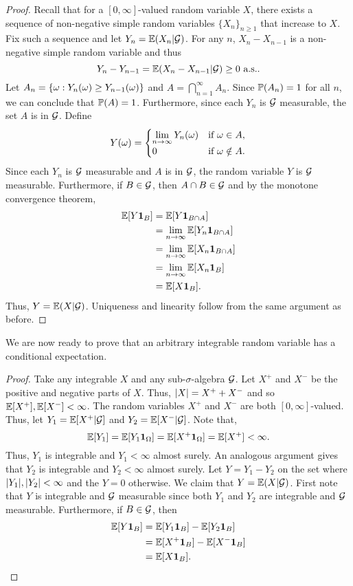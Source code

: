 \begin{proof}
    Recall that for a $[0,\infty]$-valued random variable $X$, there exists a sequence of non-negative simple random variables $\{X_n\}_{n \ge 1}$ that increase to $X$. Fix such a sequence and let $Y_n = {\mathbb{E}}(X_n|{\mathcal{G}})$. For any $n$, $X_{n}-X_{n-1}$ is a non-negative simple random variable and thus 
    \[Y_n - Y_{n-1} = {\mathbb{E}}(X_n-X_{n-1}|{\mathcal{G}}) \ge 0 ~\text{a.s.}. \]
    Let $A_n = \{{\omega}: Y_n({\omega}) \ge Y_{n-1}({\omega})\}$ and $A = \bigcap_{n=1}^\infty A_n$. Since ${\mathbb{P}}(A_n)=1$ for all $n$, we can conclude that ${\mathbb{P}}(A)=1$. Furthermore, since each $Y_n$ is ${\mathcal{G}}$ measurable, the set $A$ is in ${\mathcal{G}}$. Define 
    \[Y({\omega}) = \begin{cases}
        \lim\limits_{n \to \infty} Y_n({\omega}) & \text{if } {\omega} \in A,\\
        0 & \text{if } {\omega} \notin A.
    \end{cases} \]
    Since each $Y_n$ is ${\mathcal{G}}$ measurable and $A$ is in ${\mathcal{G}}$, the random variable $Y$ is ${\mathcal{G}}$ measurable. Furthermore, if $B \in {\mathcal{G}}$, then $A \cap B \in {\mathcal{G}}$ and by the monotone convergence theorem,
    \begin{align*}
        {\mathbb{E}}[Y{{\bf 1}}_B]&={\mathbb{E}}[Y{{\bf 1}}_{B \cap A}]\\
        &=\lim_{n \to \infty} {\mathbb{E}}[Y_n{{\bf 1}}_{B \cap A}]\\
        &=\lim_{n \to \infty} {\mathbb{E}}[X_n{{\bf 1}}_{B \cap A}]\\
        &=\lim_{n \to \infty} {\mathbb{E}}[X_n{{\bf 1}}_B]\\
        &={\mathbb{E}}[X{{\bf 1}}_B].
    \end{align*}
    Thus, $Y = {\mathbb{E}}(X|{\mathcal{G}})$. Uniqueness and linearity follow from the same argument as before.
\end{proof}
We are now ready to prove that an arbitrary integrable random variable has a conditional expectation.
\begin{proof}
    Take any integrable $X$ and any sub-$\sigma$-algebra ${\mathcal{G}}$. Let $X^+$ and $X^-$ be the positive and negative parts of $X$. Thus, ${\left\lvert X\right\rvert} = X^++X^-$ and so ${\mathbb{E}}[X^+], {\mathbb{E}}[X^-] < \infty$. The random variables $X^+$ and $X^-$ are both $[0,\infty]$-valued. Thus, let $Y_1 = {\mathbb{E}}[X^+|{\mathcal{G}}]$ and $Y_2 = {\mathbb{E}}[X^-|{\mathcal{G}}]$. Note that,
    \[{\mathbb{E}}[Y_1] = {\mathbb{E}}[Y_1 {{\bf 1}}_{{\Omega}}] = {\mathbb{E}}[X^+{{\bf 1}}_{{\Omega}}] = {\mathbb{E}}[X^+] < \infty.\]
    Thus, $Y_1$ is integrable and  $Y_1 < \infty$ almost surely. An analogous argument gives that $Y_2$ is integrable and $Y_2 < \infty$ almost surely. Let $Y=Y_1-Y_2$ on the set where ${\left\lvert Y_1\right\rvert},{\left\lvert Y_2\right\rvert}< \infty$ and the $Y=0$ otherwise. We claim that $Y = {\mathbb{E}}(X|{\mathcal{G}})$. First note that $Y$ is integrable and ${\mathcal{G}}$ measurable since both $Y_1$ and $Y_2$ are integrable and ${\mathcal{G}}$ measurable. Furthermore, if $B \in {\mathcal{G}}$, then
    \begin{align*}
        {\mathbb{E}}[Y{{\bf 1}}_B] &={\mathbb{E}}[Y_1{{\bf 1}}_B]-{\mathbb{E}}[Y_2 {{\bf 1}}_B]\\
        &={\mathbb{E}}[X^+{{\bf 1}}_B]-{\mathbb{E}}[X^-{{\bf 1}}_B]\\
        &={\mathbb{E}}[X{{\bf 1}}_B].\qedhere 
    \end{align*}
\end{proof}
